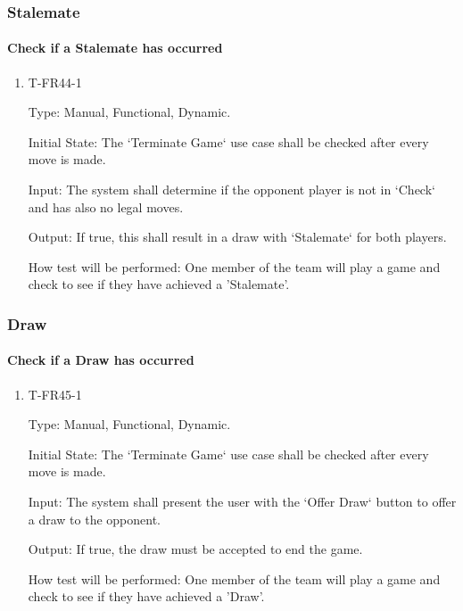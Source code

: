 \documentclass[12pt, titlepage]{article}
\begin{document}
\subsubsection{Stalemate}

    \paragraph{Check if a Stalemate has occurred}

            \begin{enumerate}

            \item{T-FR44-1\\}

                Type: Manual, Functional, Dynamic.
                					
                Initial State: The ‘Terminate Game‘ use case shall be checked after every move is made.
                					
                Input: The system shall determine if the opponent player is not in ‘Check‘ and has also no legal moves.
                					
                Output: If true, this shall result in a draw with ‘Stalemate‘ for both players.

                How test will be performed: One member of the team will play a game and check to see if they have achieved a 'Stalemate'.

            \end{enumerate}

\subsubsection{Draw}

    \paragraph{Check if a Draw has occurred}

            \begin{enumerate}

            \item{T-FR45-1\\}

                Type: Manual, Functional, Dynamic.
                					
                Initial State: The ‘Terminate Game‘ use case shall be checked after every move is made.
                					
                Input: The system shall present the user with the ‘Offer Draw‘ button to offer a draw to the opponent.
                					
                Output: If true, the draw must be accepted to end the game.

                How test will be performed: One member of the team will play a game and check to see if they have achieved a 'Draw'.

            \end{enumerate}
\end{document}

